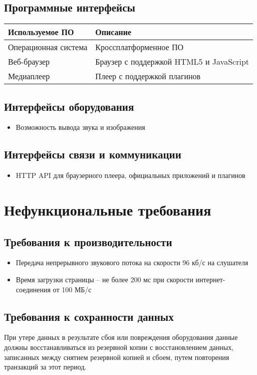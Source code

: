 \subsection{Программные интерфейсы}
\begin{tabular}{ll}
    \hline
    \textbf{Используемое ПО} & \textbf{Описание} \\ \hline
    Операционная система & Кроссплатформенное ПО \\ \hline
    Веб-браузер & Браузер с поддержкой HTML5 и JavaScript \\ \hline
    Медиаплеер & Плеер с поддержкой плагинов \\ \hline
\end{tabular}

\subsection{Интерфейсы оборудования}
\begin{itemize}
    \item Возможность вывода звука и изображения
\end{itemize}

\subsection{Интерфейсы связи и коммуникации}
\begin{itemize}
    \item HTTP API для браузерного плеера, официальных приложений и плагинов
\end{itemize}

\section{Нефункциональные требования}
\subsection{Требования к производительности}
\begin{itemize}
    \item Передача непрерывного звукового потока на скорости 96 кб/с на слушателя
    \item Время загрузки страницы -- не более 200 мс при скорости интернет-соединения от 100 МБ/с
\end{itemize}

\subsection{Требования к сохранности данных}
При утере данных в результате сбоя или повреждения оборудования данные должны восстанавливаться из
резервной копии с восстановлением данных, записанных между снятием резервной копией и сбоем,
путем повторения транзакций за этот период.

